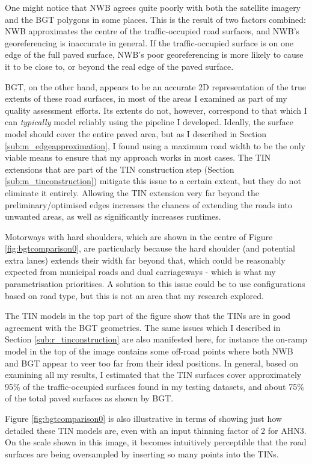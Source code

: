 One might notice that NWB agrees quite poorly with both the satellite imagery and the BGT polygons in some places. This is the result of two factors combined: NWB approximates the centre of the traffic-occupied road surfaces, and NWB's georeferencing is inaccurate in general. If the traffic-occupied surface is on one edge of the full paved surface, NWB's poor georeferencing is more likely to cause it to be close to, or beyond the real edge of the paved surface.

BGT, on the other hand, appears to be an accurate 2D representation of the true extents of these road surfaces, in most of the areas I examined as part of my quality assessment efforts. Its extents do not, however, correspond to that which I can \textit{typically} model reliably using the pipeline I developed. Ideally, the surface model should cover the entire paved area, but as I described in Section \ref{sub:m_edgeapproximation}, I found using a maximum road width to be the only viable means to ensure that my approach works in most cases. The TIN extensions that are part of the TIN construction step (Section \ref{sub:m_tinconstruction}) mitigate this issue to a certain extent, but they do not eliminate it entirely. Allowing the TIN extension very far beyond the preliminary/optimised edges increases the chances of extending the roads into unwanted areas, as well as significantly increases runtimes.

Motorways with hard shoulders, which are shown in the centre of Figure \ref{fig:bgtcomparison0}, are particularly because the hard shoulder (and potential extra lanes) extends their width far beyond that, which could be reasonably expected from municipal roads and dual carriageways - which is what my parametrisation prioritises. A solution to this issue could be to use configurations based on road type, but this is not an area that my research explored.

The TIN models in the top part of the figure show that the TINs are in good agreement with the BGT geometries. The same issues which I described in Section \ref{sub:r_tinconstruction} are also manifested here, for instance the on-ramp model in the top of the image contains some off-road points where both NWB and BGT appear to veer too far from their ideal positions. In general, based on examining all my results, I estimated that the TIN surfaces cover approximately 95\% of the traffic-occupied surfaces found in my testing datasets, and about 75\% of the total paved surfaces as shown by BGT.

Figure \ref{fig:bgtcomparison0} is also illustrative in terms of showing just how detailed these TIN models are, even with an input thinning factor of 2 for AHN3. On the scale shown in this image, it becomes intuitively perceptible that the road surfaces are being oversampled by inserting so many points into the TINs.

